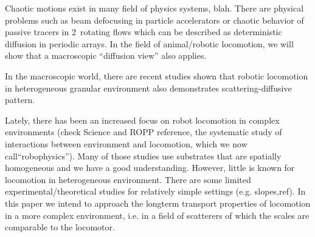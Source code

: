 Chaotic motions exist in many field of physics systems, blah. There are
physical problems such as beam defocusing in particle accelerators or
chaotic behavior of passive tracers in $2$\dmn\ rotating flows which can
be described as deterministic diffusion in periodic arrays. In the field
of animal/robotic locomotion, we will show that a macroscopic ``diffusion
view'' also applies.

In the macroscopic world, there are recent
studies shown that robotic locomotion in heterogeneous granular
environment also demonstrates scattering-diffusive pattern.

Lately, there has been an increased focus on robot locomotion in complex
environments (check Science and ROPP reference, the systematic study of
interactions between environment and locomotion, which we now
call``robophysics''). Many of those studies use substrates that are
spatially homogeneous and we have a good
understanding. However, little is
known for locomotion in heterogeneous environment. There are some limited
experimental/theoretical studies for relatively simple settings (e.g.
slopes,ref). In this paper we intend to approach the longterm transport
properties of locomotion in a more complex environment, i.e. in a field
of scatterers of which the scales are comparable to the locomotor.
